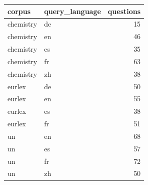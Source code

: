 \begin{tabular}{llr}
\toprule
corpus & query\_language & questions \\
\midrule
chemistry & de & 15 \\
chemistry & en & 46 \\
chemistry & es & 35 \\
chemistry & fr & 63 \\
chemistry & zh & 38 \\
eurlex & de & 50 \\
eurlex & en & 55 \\
eurlex & es & 38 \\
eurlex & fr & 51 \\
un & en & 68 \\
un & es & 57 \\
un & fr & 72 \\
un & zh & 50 \\
\bottomrule
\end{tabular}
